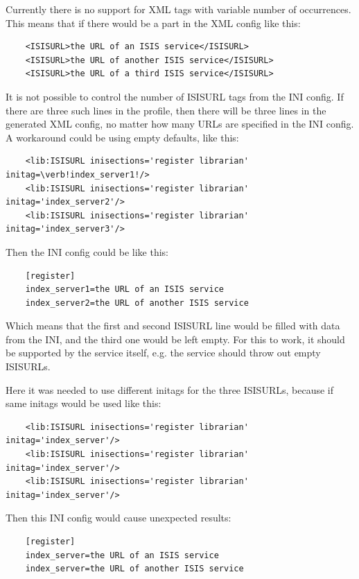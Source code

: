 \documentclass{article}
\begin{document}
Currently there is no support for XML tags with variable number of occurrences. This means that if there would be a part in the XML config like this:

\begin{verbatim}
	<ISISURL>the URL of an ISIS service</ISISURL>
	<ISISURL>the URL of another ISIS service</ISISURL>
	<ISISURL>the URL of a third ISIS service</ISISURL>
\end{verbatim}

It is not possible to control the number of ISISURL tags from the INI config. If there are three such lines in the profile, then there will be three lines in the generated XML config, no matter how many URLs are specified in the INI config. A workaround could be using empty defaults, like this:

\begin{verbatim}
	<lib:ISISURL inisections='register librarian' initag=\verb!index_server1!/>
	<lib:ISISURL inisections='register librarian' initag='index_server2'/>
	<lib:ISISURL inisections='register librarian' initag='index_server3'/>
\end{verbatim}

Then the INI config could be like this:

\begin{verbatim}
	[register]
	index_server1=the URL of an ISIS service
	index_server2=the URL of another ISIS service
\end{verbatim}

Which means that the first and second ISISURL line would be filled with data from the INI, and the third one would be left empty. For this to work, it should be supported by the service itself, e.g. the service should throw out empty ISISURLs.

Here it was needed to use different initags for the three ISISURLs, because if same initags would be used like this:


\begin{verbatim}
	<lib:ISISURL inisections='register librarian' initag='index_server'/>
	<lib:ISISURL inisections='register librarian' initag='index_server'/>
	<lib:ISISURL inisections='register librarian' initag='index_server'/>
\end{verbatim}

Then this INI config would cause unexpected results:


\begin{verbatim}
	[register]
	index_server=the URL of an ISIS service
	index_server=the URL of another ISIS service
\end{verbatim}
\end{document}
